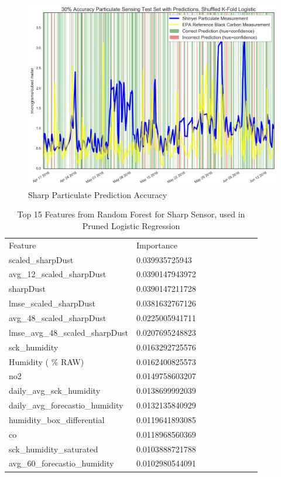 \begin{figure}[htb]
 	\includegraphics[width=\textwidth]{figs/sharp_goals_30_logistic_predictions}               
 	 \caption{Sharp Particulate Prediction Accuracy}
  	\label{fig:sharp_30_logistic_predictions}
\end{figure}

\begin{table}[H]
\centering
\begin{tabular}{lllllllll}
\\
\\
\toprule
Feature & Importance \\
\midrule
 scaled\_sharpDust &  0.039935725943 \\
 avg\_12\_scaled\_sharpDust &  0.0390147943972 \\
 sharpDust &  0.0390147211728 \\
 lmse\_scaled\_sharpDust &  0.0381632767126 \\
 avg\_48\_scaled\_sharpDust &  0.0225005941711 \\
 lmse\_avg\_48\_scaled\_sharpDust &  0.0207695248823 \\
 sck\_humidity &  0.0163292725576 \\
 Humidity ( \% RAW) &  0.0162400825573 \\
 no2 &  0.0149758603207 \\
 daily\_avg\_sck\_humidity &  0.0138699992039 \\
 daily\_avg\_forecastio\_humidity &  0.0132135840929 \\
 humidity\_box\_differential &  0.0119641893085 \\
 co &  0.0118968560369 \\
 sck\_humidity\_saturated &  0.0103888721788 \\
 avg\_60\_forecastio\_humidity &  0.0102980544091 \\
\bottomrule
\end{tabular}
\label{tab:sharp_randomforest_features}
\caption{Top 15 Features from Random Forest for Sharp Sensor, used in Pruned Logistic Regression}
\end{table}

